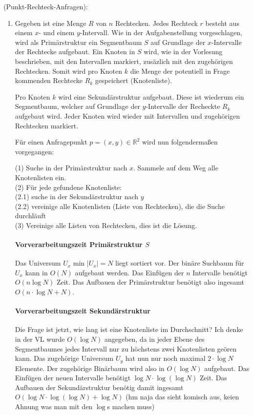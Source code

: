 \documentclass[a4paper, titlepage=false, parskip=full-, 10pt]{scrartcl}
\newcounter{tasknbr}
\newenvironment{task}[1]{{\bf Aufgabe \arabic {tasknbr}\stepcounter{tasknbr}} (#1):\begin{enumerate}}{\end{enumerate}}
\begin{document}
\newpage
\begin{task}{Punkt-Rechteck-Anfragen}
\item[]
Gegeben ist eine Menge $R$ von $n$ Rechtecken. Jedes Rechteck $r$ besteht aus einem $x$- und einem $y$-Intervall. Wie in der Aufgabenstellung vorgeschlagen, wird als Primärstruktur ein Segmentbaum $S$ auf Grundlage der $x$-Intervalle der Rechtecke aufgebaut. Ein Knoten in $S$ wird, wie in der Vorlesung beschrieben, mit den Intervallen markiert, zusäzlich mit den zugehörigen Rechtecken. Somit wird pro Knoten $k$ die Menge der potentiell in Frage kommenden Rechtecke $R_k$ gespeichert (Knotenliste).

Pro Knoten $k$ wird eine Sekundärstruktur aufgebaut. Diese ist wiederum ein Segmentbaum, welcher auf Grundlage der $y$-Intervalle der Recheckte $R_k$ aufgebaut wird. Jeder Knoten wird wieder mit Intervallen und zugehörigen Rechtecken markiert.

Für einen Anfragepunkt $p=(x,y) \in \mathbb{R}^2$ wird nun folgendermaßen vorgegangen:

(1) Suche in der Primärstruktur nach $x$. Sammele auf dem Weg alle Knotenlisten ein.\\
(2) Für jede gefundene Knotenliste:\\
(2.1) suche in der Sekundärstruktur nach $y$\\
(2.2) vereinige alle Knotenlisten (Liste von Rechtecken), die die Suche durchläuft\\
(3) Vereinige alle Listen von Rechtecken, dies ist die Lösung.\\

\paragraph*{Vorverarbeitungszeit Primärstruktur $S$}
Das Universum $U_x$ min $|U_x|=N$ liegt sortiert vor. Der binäre Suchbaum für $U_x$ kann in $O(N)$ aufgebaut werden. Das Einfügen der $n$ Intervalle benötigt $O(n\log N)$ Zeit. Das Aufbauen der Primärstruktur benötigt also ingesamt $O(n \cdot \log N + N)$.

\paragraph*{Vorverarbeitungszeit Sekundärstruktur} 
Die Frage ist jetzt, wie lang ist eine Knotenliste im Durchschnitt? Ich denke in der VL wurde $O(\log N)$ angegeben, da in jeder Ebene des Segmentbaumes jedes Intervall nur zu höchstens zwei Knotenlisten geören kann. Das zugehörige Universum $U_y$ hat nun nur noch maximal $2 \cdot \log N$ Elemente. Der zugehörige Binärbaum wird also in $O(\log N)$ aufgebaut. Das Einfügen der neuen Intervalle benötigt $\log N \cdot \log(\log N)$ Zeit. Das Aufbauen der Sekundärstruktur benötig damit ingesamt $O(\log N \cdot \log(\log N ) + \log N)$ (hm naja das sieht komisch aus, keien Ahnung was man mit den $\log$s machen muss)


\end{task}
\end{document}
